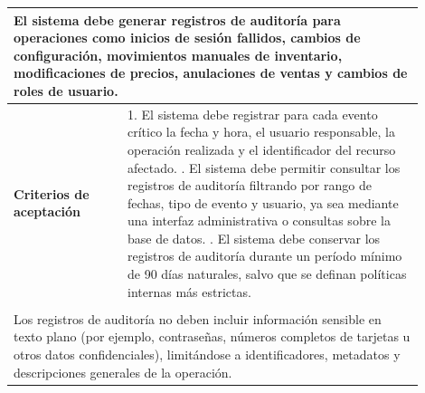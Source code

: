 \begin{longtable}{|p{0.25\linewidth}|p{0.15\linewidth}|p{0.15\linewidth}|p{0.35\linewidth}|}
		\multicolumn{4}{|p{0.96\linewidth}|}{%
		El sistema debe generar registros de auditoría para operaciones como inicios de sesión fallidos, cambios de configuración, movimientos manuales de inventario, modificaciones de precios, anulaciones de ventas y cambios de roles de usuario.}              \\ \hline
		\cellcolor{tableheaderblue}\textbf{Criterios de aceptación} & \multicolumn{3}{p{0.70\linewidth}|}{                                                                                                                                                           %
			1. El sistema debe registrar para cada evento crítico la fecha y hora, el usuario responsable, la operación realizada y el identificador del recurso afectado. \newline
			2. El sistema debe permitir consultar los registros de auditoría filtrando por rango de fechas, tipo de evento y usuario, ya sea mediante una interfaz administrativa o consultas sobre la base de datos. \newline
		3. El sistema debe conservar los registros de auditoría durante un período mínimo de 90 días naturales, salvo que se definan políticas internas más estrictas.}                                                                                              \\ \hline
		\rowcolor{tableheaderblue}
		\multicolumn{4}{|l|}{\textbf{Restricciones}}                                                                                                                                                                                                                 \\ \hline
		\multicolumn{4}{|p{0.96\linewidth}|}{%
		Los registros de auditoría no deben incluir información sensible en texto plano (por ejemplo, contraseñas, números completos de tarjetas u otros datos confidenciales), limitándose a identificadores, metadatos y descripciones generales de la operación.} \\ \hline
	
\end{longtable}
\endgroup

